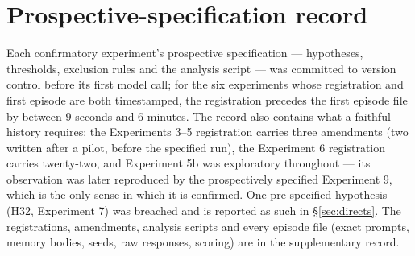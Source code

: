 \section{Prospective-specification record}\label{app:prereg}

Each confirmatory experiment's prospective specification --- hypotheses, thresholds,
exclusion rules and the analysis script --- was committed to version control
before its first model call; for the six experiments whose registration and
first episode are both timestamped, the registration precedes the first episode
file by between 9 seconds and 6 minutes. The record also contains what a
faithful history requires: the Experiments 3--5 registration carries three
amendments (two written after a pilot, before the specified run), the
Experiment 6 registration carries twenty-two, and Experiment 5b was exploratory
throughout --- its observation was later reproduced by the prospectively specified
Experiment 9, which is the only sense in which it is confirmed. One pre-specified
hypothesis (H32, Experiment 7) was breached and is reported as such in
\S\ref{sec:directs}. The registrations, amendments, analysis scripts and every
episode file (exact prompts, memory bodies, seeds, raw responses, scoring) are
in the supplementary record.
